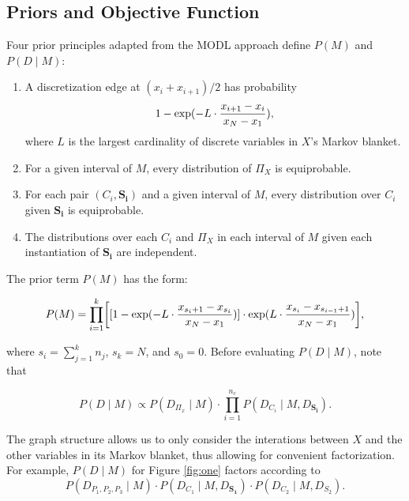 

\subsection{Priors and Objective Function}

Four prior principles adapted from the MODL approach define $P(M)$ and $P(D \mid M)$:
\begin{enumerate}
\item A discretization edge at $(x_i + x_{i+1})/2$ has probability
\begin{equation}
1 - {\exp(- L \cdot {{x_{i+1} - x_i}\over{x_N - x_1}})},
\end{equation}
where $L$ is the largest cardinality of discrete variables in $X$'s Markov blanket.
\item For a given interval of $M$, every distribution of $\Pi_X$ is equiprobable.
\item For each pair $(C_i,\boldsymbol{S_i})$ and a given interval of $M$, every distribution over $C_i$ given $\boldsymbol{S_i}$ is equiprobable.
\item The distributions over each $C_i$ and $\Pi_X$ in each interval of $M$ given each instantiation of $\boldsymbol{S_i}$ are independent.
\end{enumerate}

The prior term $P(M)$ has the form:

\begin{equation}
\label{eq:p_M}
P(M) = \prod_{i=1}^k \brock{ [1 - {\exp(- L \cdot {{x_{s_i+1} - x_{s_i}}\over{x_N - x_1}})}] \cdot \exp(L \cdot {{x_{s_{i}} - x_{s_{i-1} + 1}}\over{x_N - x_1}}) }\text{,}
\end{equation}

\noindent
where $s_i = \sum_{j=1}^k n_j$, $s_k = N$, and $s_0 = 0$. Before evaluating $P(D \mid M)$, note that

\begin{equation}
\label{eq:p_D_given_M}
P(D \mid M) \propto P(D_{\Pi_x} \mid M) \cdot \prod_{i = 1}^{n_c} P(D_{C_i} \mid M, D_{\boldsymbol{S_i}})\text{.}
\end{equation}

The graph structure allows us to only consider the interations between $X$ and the other variables in its Markov blanket, thus allowing for convenient factorization. For example, $P(D \mid M)$ for Figure \ref{fig:one} factors according to
\begin{equation}
P(D_{ P_1,P_2,P_3 } \mid M) \cdot P( D_{ C_1 } \mid M,D_{\boldsymbol{S_1}}) \cdot P(D_{C_2} \mid M,D_{ S_2  })\text{.}
\end{equation}

